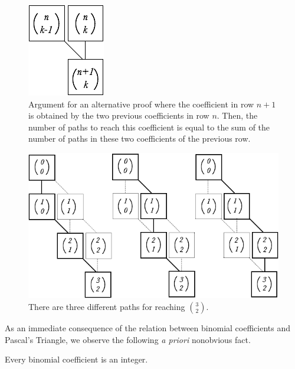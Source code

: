 \begin{figure}[htb]
\begin{center}
       \includegraphics[scale=0.4]{FiguresMaths/CoeffBinomiaux2}
\caption{Argument for an alternative proof where the coefficient in row $n+1$ is obtained by the two previous coefficients in row $n$.
Then, the number of paths to reach this coefficient is equal to the sum of the number of paths in these two coefficients of the previous row.}
\label{fig:binomialCoeff2}
\end{center}
\end{figure}

\begin{figure}[htb]
\begin{center}
       \includegraphics[scale=0.4]{FiguresMaths/CoeffBinomiauxCounting}
\caption{There are three different paths for reaching ${3 \choose 2}.$}
\label{fig:binomialCoeff3}
\end{center}
\end{figure}

As an immediate consequence of the relation between binomial
coefficients and Pascal's Triangle, we observe the following {\it a
  priori} nonobvious fact.

\begin{prop}
\label{thm:binomcoeff-integer}
Every binomial coefficient is an integer.
\end{prop}


